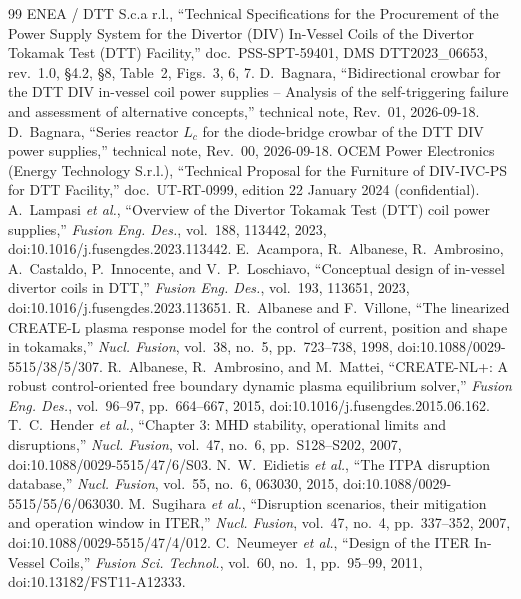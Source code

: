\documentclass[11pt,a4paper]{article}
\begin{document}
\begin{thebibliography}{99}
\small
{} ENEA / DTT S.c.a r.l., ``Technical Specifications for the Procurement of the Power Supply System for the Divertor (DIV) In-Vessel Coils of the Divertor Tokamak Test (DTT) Facility,'' doc.\ PSS-SPT-59401, DMS DTT2023\_06653, rev.~1.0, \S4.2, \S8, Table~2, Figs.~3, 6, 7.
 D.~Bagnara, ``Bidirectional crowbar for the DTT DIV in-vessel coil power supplies -- Analysis of the self-triggering failure and assessment of alternative concepts,'' technical note, Rev.~01, 2026-09-18.
 D.~Bagnara, ``Series reactor $L_c$ for the diode-bridge crowbar of the DTT DIV power supplies,'' technical note, Rev.~00, 2026-09-18.
 OCEM Power Electronics (Energy Technology S.r.l.), ``Technical Proposal for the Furniture of DIV-IVC-PS for DTT Facility,'' doc.\ UT-RT-0999, edition 22 January 2024 (confidential).
 A.~Lampasi \emph{et al.}, ``Overview of the Divertor Tokamak Test (DTT) coil power supplies,'' \emph{Fusion Eng. Des.}, vol.~188, 113442, 2023, doi:10.1016/j.fusengdes.2023.113442.
 E.~Acampora, R.~Albanese, R.~Ambrosino, A.~Castaldo, P.~Innocente, and V.~P.~Loschiavo, ``Conceptual design of in-vessel divertor coils in DTT,'' \emph{Fusion Eng. Des.}, vol.~193, 113651, 2023, doi:10.1016/j.fusengdes.2023.113651.
 R.~Albanese and F.~Villone, ``The linearized CREATE-L plasma response model for the control of current, position and shape in tokamaks,'' \emph{Nucl. Fusion}, vol.~38, no.~5, pp.~723--738, 1998, doi:10.1088/0029-5515/38/5/307.
 R.~Albanese, R.~Ambrosino, and M.~Mattei, ``CREATE-NL+: A robust control-oriented free boundary dynamic plasma equilibrium solver,'' \emph{Fusion Eng. Des.}, vol.~96--97, pp.~664--667, 2015, doi:10.1016/j.fusengdes.2015.06.162.
 T.~C.~Hender \emph{et al.}, ``Chapter 3: MHD stability, operational limits and disruptions,'' \emph{Nucl. Fusion}, vol.~47, no.~6, pp.~S128--S202, 2007, doi:10.1088/0029-5515/47/6/S03.
 N.~W.~Eidietis \emph{et al.}, ``The ITPA disruption database,'' \emph{Nucl. Fusion}, vol.~55, no.~6, 063030, 2015, doi:10.1088/0029-5515/55/6/063030.
 M.~Sugihara \emph{et al.}, ``Disruption scenarios, their mitigation and operation window in ITER,'' \emph{Nucl. Fusion}, vol.~47, no.~4, pp.~337--352, 2007, doi:10.1088/0029-5515/47/4/012.
 C.~Neumeyer \emph{et al.}, ``Design of the ITER In-Vessel Coils,'' \emph{Fusion Sci. Technol.}, vol.~60, no.~1, pp.~95--99, 2011, doi:10.13182/FST11-A12333.

\end{thebibliography}
\end{document}
